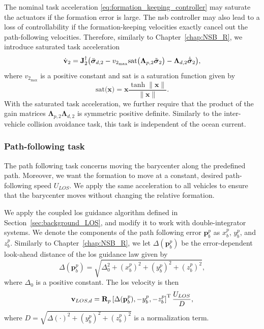 The nominal task acceleration \eqref{eq:formation_keeping_controller} may saturate the actuators if the formation error is large. The \gls{nsb} controller may also lead to a loss of controllability if the formation-keeping velocities exactly cancel out the path-following velocities. Therefore, similarly to Chapter~\ref{chap:NSB_R}, we introduce saturated task acceleration
\begin{equation}\label{eq:saturated_formation_keeping}
\dot{\mathbf{v}}_2 = \mathbf{J}_2^\dagger \bigl(\ddot{\bm{\sigma}}_{d,2} - v_{2_{\max}}\mathrm{sat}\bigl(\mathbf{\Lambda}_{p,2}\Tilde{\bm{\sigma}}_2\bigr) - \mathbf{\Lambda}_{d,2} \dot{\Tilde{\bm{\sigma}}}_2\bigr),
\end{equation}
where $v_{2_{\max}}$ is a positive constant and $\mathrm{sat}$ is a saturation function given by
\begin{equation}
    \mathrm{sat}\bigl(\mathbf{x}\bigr) = \mathbf{x}\frac{\tanh{\|\mathbf{x}\|}}{\|\mathbf{x}\|}.
\end{equation}
With the saturated task acceleration, we further require that the product of the gain matrices $\mathbf{\Lambda}_{p,2} \mathbf{\Lambda}_{d,2}$ is symmetric positive definite.
Similarly to the inter-vehicle collision avoidance task, this task is independent of the ocean current.%

\subsubsection{Path-following task}
The path following task concerns moving the barycenter along the predefined path. Moreover, we want the formation to move at a constant, desired path-following speed $U_{LOS}$. We apply the same acceleration to all vehicles to ensure that the barycenter moves without changing the relative formation.

We apply the coupled \acrfull{los} guidance algorithm defined in Section~\ref{sec:background_LOS}, and modify it to work with double-integrator systems. We denote the components of the path following error $\mathbf{p}_b^p$ as $x_b^p$, $y_b^p$, and $z_b^p$. Similarly to Chapter~\ref{chap:NSB_R}, we let $\Delta(\mathbf{p}_b^p)$ be the error-dependent look-ahead distance of the \gls{los} guidance law given by
\begin{equation}
    \Delta(\mathbf{p}_b^p) = \sqrt{\Delta_0^2 + (x_b^p)^2 + (y_b^p)^2 + (z_b^p)^2},
\end{equation}
where $\Delta_0$ is a positive constant. The \gls{los} velocity is then
\begin{equation}\label{eq:desired_LOS}
    \mathbf{v}_{LOS, d} = \mathbf{R}_p \left[ \Delta(\mathbf{p}_b^p), -y_b^p, -z_b^p \right]^{\mathrm{T}} \frac{U_{LOS}}{D},
\end{equation}
where 
$
    D = \sqrt{\Delta(\cdot)^2 + (y_b^p)^2 + (z_b^p)^2}
$
is a normalization term.

